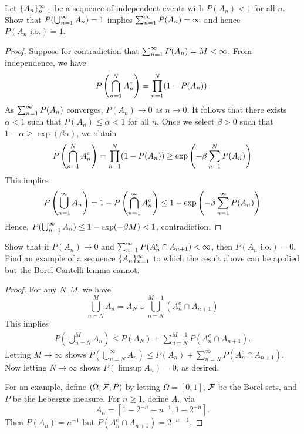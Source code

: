 \documentclass[a4paper]{article}
\begin{document}
\begin{ex}[Durrett 2.3.8]
  Let $\{ A_n \}_{n=1}^\infty$ be a sequence of independent events with $P(A_n) < 1$
  for all $n$. Show that $P (\bigcup_{n=1}^\infty A_n) = 1$
  implies $\sum_{n=1}^\infty P(A_n) = \infty$ and hence $P(A_n \text{ i.o.}) = 1$.
\end{ex}

\begin{proof}
  Suppose for contradiction that $\sum_{n=1}^\infty P(A_n) = M < \infty$.
  From independence, we have
  \begin{align*}
    P \left( \bigcap_{n=1}^N A_n^c \right)
    = \prod_{n=1}^N (1 - P(A_n)).
  \end{align*}
  As $\sum_{n=1}^\infty P(A_n)$ converges, $P(A_n) \to 0$ as $n \to 0$.
  It follows that there exists $\alpha < 1$
  such that $P(A_n) \leq \alpha < 1$ for all $n$.
  Once we select $\beta > 0$ such that $1 - \alpha \geq \exp (\beta \alpha)$,
  we obtain
  \begin{align*}
    P \left( \bigcap_{n=1}^N A_n^c \right)
    = \prod_{n=1}^N (1 - P(A_n))
    \geq \exp \left( - \beta \sum_{n=1}^N P(A_n) \right)
  \end{align*}
  This implies
  \begin{align*}
    P \left( \bigcup_{n=1}^\infty A_n \right)
    = 1 - P \left( \bigcap_{n=1}^\infty A_n^c \right)
    \leq 1 - \exp \left( - \beta \sum_{n=1}^\infty P(A_n) \right)
  \end{align*}
  Hence, $P (\bigcup_{n=1}^\infty A_n) \leq 1 - \exp (- \beta M) < 1$, contradiction.

\end{proof}

\begin{ex}[Durrett 2.3.9]
  Show that if $P (A_n) \to 0$ and $\sum_{n=1}^\infty P (A_n^c \cap A_{n + 1}) < \infty$,
  then $P (A_n \text{ i.o.}) = 0$. Find an example of a sequence
  $\{ A_n \}_{n=1}^\infty$ to which the result above can
  be applied but the Borel-Cantelli lemma cannot.
\end{ex}

\begin{proof}
  For any $N, M$, we have
  \[
    \bigcup_{n = N}^M A_n
    = A_N \cup \bigcup_{n = N}^{M - 1} (A_n^c \cap A_{n + 1})
  \]
  This implies
  \begin{align*}
    P \left( \bigcup_{n = N}^M A_n \right)
    \leq P (A_N) + \sum_{n = N}^{M - 1} P (A_n^c \cap A_{n + 1}).
  \end{align*}
  Letting $M \to \infty$ shows
  $P (\bigcup_{n = N}^\infty A_n) \leq P(A_n) + \sum_{n = N}^\infty
    P (A_n^c \cap A_{n + 1})$.
  Now letting $N \to \infty$ shows $P (\limsup A_n) = 0$, as desired.

  For an example, define $(\Omega, \mathcal{F}, P)$ by letting $\Omega = [0, 1]$,
  $\mathcal{F}$ be the Borel sets, and $P$ be the Lebesgue measure.
  For $n \geq 1$, define $A_n$ via
  \[
    A_n = \left[ 1 - 2^{-n} - n^{-1} , 1 - 2^{-n} \right].
  \]
  Then $P(A_n) = n^{-1}$ but $P(A_n^c \cap A_{n + 1}) = 2^{-n - 1}$.


\end{proof}
\end{document}
